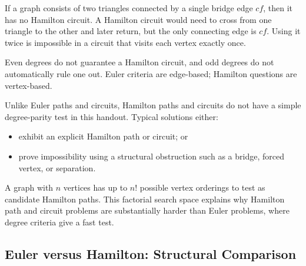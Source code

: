 \begin{examplebox}[title={Bridge obstruction to a Hamilton circuit}]
If a graph consists of two triangles connected by a single bridge edge \(cf\), then it has no Hamilton circuit. A Hamilton circuit would need to cross from one triangle to the other and later return, but the only connecting edge is \(cf\). Using it twice is impossible in a circuit that visits each vertex exactly once.
\end{examplebox}

\begin{commonmistake}[title={Using Euler criteria for Hamilton problems}]
Even degrees do not guarantee a Hamilton circuit, and odd degrees do not automatically rule one out. Euler criteria are edge-based; Hamilton questions are vertex-based.
\end{commonmistake}

\begin{examtip}[title={How Hamilton problems are usually handled}]
Unlike Euler paths and circuits, Hamilton paths and circuits do not have a simple degree-parity test in this handout. Typical solutions either:
\begin{itemize}[leftmargin=*]
    \item exhibit an explicit Hamilton path or circuit; or
    \item prove impossibility using a structural obstruction such as a bridge, forced vertex, or separation.
\end{itemize}
\end{examtip}

\begin{extension}[title={Why Hamilton problems are harder}]
A graph with \(n\) vertices has up to \(n!\) possible vertex orderings to test as candidate Hamilton paths. This factorial search space explains why Hamilton path and circuit problems are substantially harder than Euler problems, where degree criteria give a fast test.
\end{extension}

\subsection{Euler versus Hamilton: Structural Comparison}

